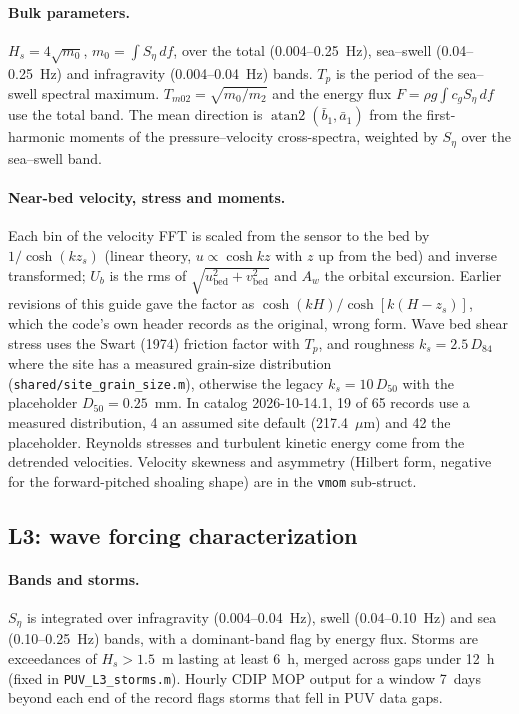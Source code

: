 \documentclass[11pt]{article}
\newcommand{\code}[1]{\texttt{#1}}
\begin{document}
\paragraph{Bulk parameters.} $H_s = 4\sqrt{m_0}$, $m_0 = \int S_\eta\,df$, over the total
(0.004--0.25~Hz), sea--swell (0.04--0.25~Hz) and infragravity (0.004--0.04~Hz) bands. $T_p$ is
the period of the sea--swell spectral maximum. $T_{m02} = \sqrt{m_0/m_2}$ and the energy flux
$F = \rho g \int c_g S_\eta\,df$ use the total band. The mean direction is
$\operatorname{atan2}(\bar b_1, \bar a_1)$ from the first-harmonic moments of the
pressure--velocity cross-spectra, weighted by $S_\eta$ over the sea--swell band.

\paragraph{Near-bed velocity, stress and moments.} Each bin of the velocity FFT is scaled from
the sensor to the bed by $1/\cosh(kz_s)$ (linear theory, $u \propto \cosh kz$ with $z$ up from
the bed) and inverse transformed; $U_b$ is the rms of $\sqrt{u_\text{bed}^2+v_\text{bed}^2}$ and
$A_w$ the orbital excursion. Earlier revisions of this guide gave the factor as
$\cosh(kH)/\cosh[k(H-z_s)]$, which the code's own header records as the original, wrong form.
Wave bed shear stress uses the Swart (1974) friction factor with $T_p$, and roughness
$k_s = 2.5\,D_{84}$ where the site has a measured grain-size distribution
(\code{shared/site\_grain\_size.m}), otherwise the legacy $k_s = 10\,D_{50}$ with the
placeholder $D_{50} = 0.25$~mm. In catalog 2026-10-14.1, 19 of 65 records use a measured
distribution, 4 an assumed site default (217.4~$\mu$m) and 42 the placeholder. Reynolds
stresses and turbulent kinetic energy come from the detrended velocities. Velocity skewness and
asymmetry (Hilbert form, negative for the forward-pitched shoaling shape) are in the \code{vmom}
sub-struct.

\subsection{L3: wave forcing characterization}
\label{sec:l3methods}

\paragraph{Bands and storms.} $S_\eta$ is integrated over infragravity (0.004--0.04~Hz), swell
(0.04--0.10~Hz) and sea (0.10--0.25~Hz) bands, with a dominant-band flag by energy flux. Storms
are exceedances of $H_s > 1.5$~m lasting at least 6~h, merged across gaps under 12~h (fixed in
\code{PUV\_L3\_storms.m}). Hourly CDIP MOP output for a window 7~days beyond each end of the
record flags storms that fell in PUV data gaps.
\end{document}
